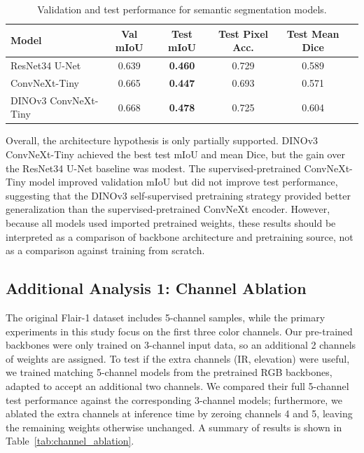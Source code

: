 \documentclass{article}
\begin{document}
\begin{table}[h]
  \caption{Validation and test performance for semantic segmentation models.}
  \label{tab:model_performance}
  \centering
  \begin{tabular}{lccccc}
    \toprule
    Model & Val mIoU & \textbf{Test mIoU} & Test Pixel Acc. & Test Mean Dice \\
    \midrule
    ResNet34 U-Net & 0.639 & \textbf{0.460} & 0.729 & 0.589 \\
    ConvNeXt-Tiny & 0.665 & \textbf{0.447} & 0.693 & 0.571 \\
    DINOv3 ConvNeXt-Tiny & 0.668 & \textbf{0.478} & 0.725 & 0.604 \\
    \bottomrule
  \end{tabular}
\end{table}

Overall, the architecture hypothesis is only partially supported. DINOv3 ConvNeXt-Tiny achieved the best test mIoU and mean Dice, but the gain over the ResNet34 U-Net baseline was modest. The supervised-pretrained ConvNeXt-Tiny model improved validation mIoU but did not improve test performance, suggesting that the DINOv3 self-supervised pretraining strategy provided better generalization than the supervised-pretrained ConvNeXt encoder. However, because all models used imported pretrained weights, these results should be interpreted as a comparison of backbone architecture and pretraining source, not as a comparison against training from scratch.

\subsection{Additional Analysis 1: Channel Ablation}
The original Flair-1 dataset includes 5-channel samples, while the primary experiments in this study focus on the first three color channels. Our pre-trained backbones were only trained on 3-channel input data, so an additional 2 channels of weights are assigned. To test if the extra channels (IR, elevation) were useful, we trained matching 5-channel models from the pretrained RGB backbones, adapted to accept an additional two channels. We compared their full 5-channel test performance against the corresponding 3-channel models; furthermore, we ablated the extra channels at inference time by zeroing channels 4 and 5, leaving the remaining weights otherwise unchanged. A summary of results is shown in Table~\ref{tab:channel_ablation}.
\end{document}
